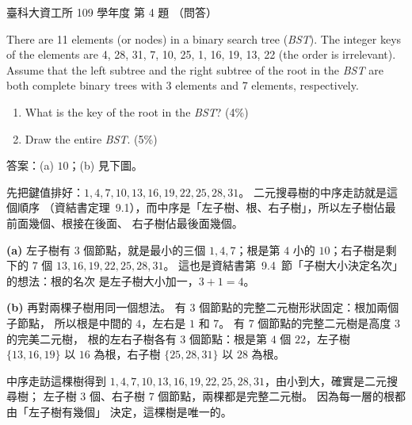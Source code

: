 \begin{pastexam}[label={px:ntust-109-ice-04}]{臺科大資工所 109 學年度 第 4 題}
（問答）

There are 11 elements (or nodes) in a binary search tree (\textit{BST}). The integer keys of the
elements are 4, 28, 31, 7, 10, 25, 1, 16, 19, 13, 22 (the order is irrelevant). Assume that the left
subtree and the right subtree of the root in the \textit{BST} are both complete binary trees with 3
elements and 7 elements, respectively.
\begin{enumerate}[label=(\alph*)]
\item What is the key of the root in the \textit{BST}? (4\%)
\item Draw the entire \textit{BST}. (5\%)
\end{enumerate}
\end{pastexam}

\begin{pastsoln}
答案：(a) $10$；(b) 見下圖。

先把鍵值排好：$1, 4, 7, 10, 13, 16, 19, 22, 25, 28, 31$。 二元搜尋樹的中序走訪就是這個順序
（資結書定理~9.1），而中序是「左子樹、根、右子樹」，所以左子樹佔最前面幾個、根接在後面、
右子樹佔最後面幾個。

\textbf{(a)} 左子樹有 $3$ 個節點，就是最小的三個 $1, 4, 7$；根是第 $4$ 小的 $10$；右子樹是剩下的
$7$ 個 $13, 16, 19, 22, 25, 28, 31$。 這也是資結書第~9.4~節「子樹大小決定名次」的想法：根的名次
是左子樹大小加一，$3 + 1 = 4$。

\textbf{(b)} 再對兩棵子樹用同一個想法。 有 $3$ 個節點的完整二元樹形狀固定：根加兩個子節點，
所以根是中間的 $4$，左右是 $1$ 和 $7$。 有 $7$ 個節點的完整二元樹是高度 $3$ 的完美二元樹，
根的左右子樹各有 $3$ 個節點：根是第 $4$ 個 $22$，左子樹 $\{13, 16, 19\}$ 以 $16$ 為根，右子樹
$\{25, 28, 31\}$ 以 $28$ 為根。
\begin{center}
\end{center}
中序走訪這棵樹得到 $1, 4, 7, 10, 13, 16, 19, 22, 25, 28, 31$，由小到大，確實是二元搜尋樹；
左子樹 $3$ 個、右子樹 $7$ 個節點，兩棵都是完整二元樹。 因為每一層的根都由「左子樹有幾個」
決定，這棵樹是唯一的。
\end{pastsoln}
